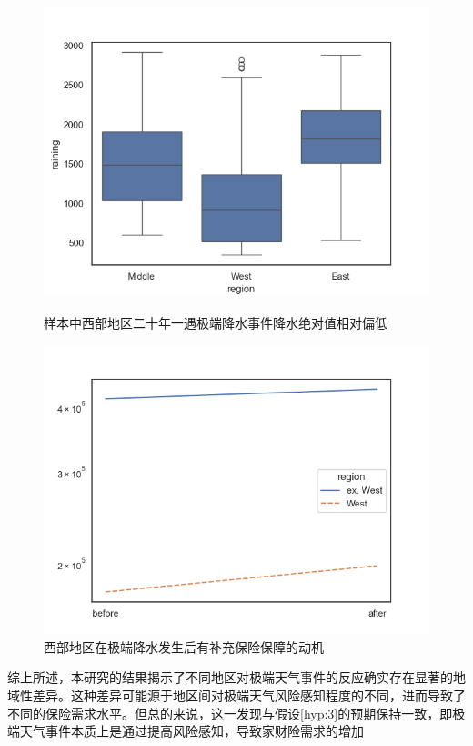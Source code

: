 \begin{figure}[H]
    \centering
    \begin{minipage}{0.48\linewidth}
        \includegraphics[width=\linewidth]{lib/img/rainings.png}
        \caption{样本中西部地区二十年一遇极端降水事件降水绝对值相对偏低}\label{fig:rainings}
    \end{minipage}
    \begin{minipage}{0.48\linewidth}
        \includegraphics[width=\linewidth]{lib/img/covbyregion.png}
        \caption{西部地区在极端降水发生后有补充保险保障的动机}
    \end{minipage}
\end{figure}

综上所述，本研究的结果揭示了不同地区对极端天气事件的反应确实存在显著的地域性差异。这种差异可能源于地区间对极端天气风险感知程度的不同，进而导致了不同的保险需求水平。但总的来说，这一发现与假设\ref{hyp:3}的预期保持一致，即极端天气事件本质上是通过提高风险感知，导致家财险需求的增加

